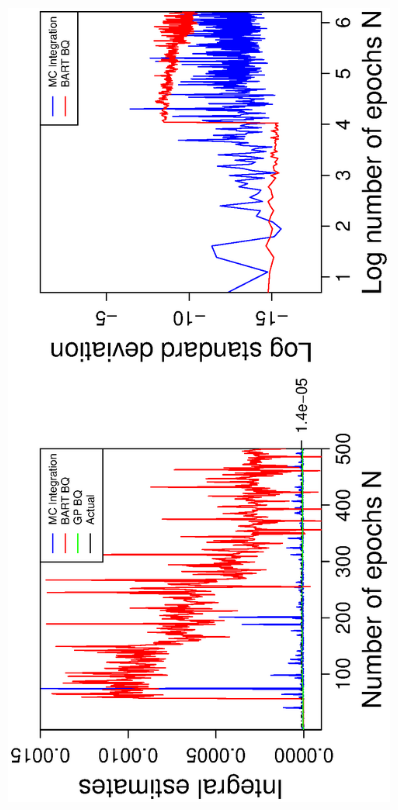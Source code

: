 \vspace{-0.5cm}
\begin{figure}[H]
  \centering
  \hspace{-1.6cm}
  \begin{minipage}[b]{0.4\textwidth}
    \includegraphics[width = 0.9\textwidth, angle = -90]{report/Figures/2/convergenceMean23Dimensions.eps}
     \vspace{-1cm}

\end{minipage}
\end{figure}
